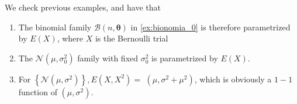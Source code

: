 \documentclass{article}
\begin{document}
\begin{exma}We check previous examples, and have that
\begin{enumerate}
    \item The binomial family  $\mathcal{B}(n, \boldsymbol{\theta})$ in \cref{ex:bionomia_0} is therefore parametrized by $E(X)$, where $X$ is the Bernoulli trial
    \item The $\mathcal{N}\left(\mu, \sigma_{0}^{2}\right)$ family with fixed $\sigma_{0}^{2}$ is  parametrized by $E(X) .$ 
    \item For $\left\{\mathcal{N}\left(\mu, \sigma^{2}\right)\right\}, E\left(X, X^{2}\right)=$ $\left(\mu, \sigma^{2}+\mu^{2}\right)$, which is obviously a $1-1$ function of $\left(\mu, \sigma^{2}\right) .$
\end{enumerate}
\end{exma}
\end{document}
